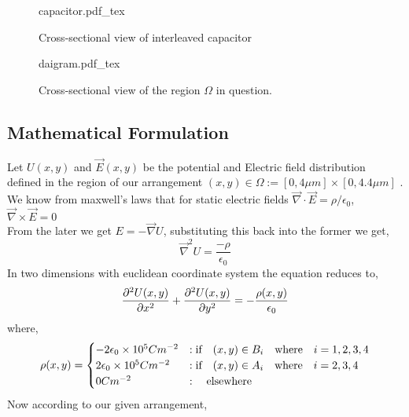\begin{figure}[ht]
    \centering
    \def\svgwidth{0.6\textwidth}
    {capacitor.pdf_tex}
    \caption{Cross-sectional view of interleaved capacitor}
    \label{fig:cap}
\end{figure}

\begin{figure}[ht]
    \centering
    \def\svgwidth{0.6\textwidth}
    {daigram.pdf_tex}
    \caption{Cross-sectional view of the region $\Omega$ in question.}
    \label{fig:cross-section capacitor}
\end{figure}
\subsection{Mathematical Formulation}
Let $U(x,y)$ and $\vec{E}(x,y)$ be the potential and Electric field distribution defined in the region of our arrangement $(x,y) \in \Omega := [0,4\mu m]\times[0,4.4\mu m]$ .\\
We know from maxwell's laws that for static electric fields $\vec{\nabla} \cdot \vec{E} = \rho / \epsilon_0 $, $\vec{\nabla} \times \vec{E} = 0$
\\
From the later we get $E=-\vec{\nabla}U$, substituting this back into the former we get,
\begin{equation*}
    \vec{\nabla}^2 U = \frac{-\rho}{\epsilon_0}  
\end{equation*}
In two dimensions with euclidean coordinate system the equation reduces to, 
\begin{equation}
    \frac{\partial^2U(x,y) }{\partial x^{2}} + \frac{\partial^2U(x,y) }{\partial y^{2}}= -\frac{\rho(x,y)}{\epsilon_0} \\
\end{equation}
where,
\begin{equation}
\rho(x,y) =  \begin{cases}
    -2\epsilon_0 \times 10^5 C m^{-2} & :\text{if} \hspace{0.35cm} (x,y) \in B_i \hspace{0.35cm} \text{where} \hspace{0.35cm} i = 1,2,3,4 \\
    2\epsilon_0 \times 10^5 C m^{-2} & :\text{if} \hspace{0.35cm} (x,y) \in A_i \hspace{0.35cm} \text{where} \hspace{0.35cm} i = 2,3,4  \\
    0 C m^{-2} & : \hspace{0.35cm} \text{elsewhere}
\end{cases}  
\end{equation}
Now according to our given arrangement,
